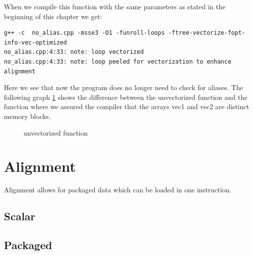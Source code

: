 \documentclass[
	12pt,
	a4paper,
	BCOR10mm,
	DIV14,
	headsepline,
	usegeometry,
]{scrreprt}
\begin{document}
When we compile this function with the same parameters as stated in the beginning of this chapter
we get: 
\begin{verbatim}
g++ -c  no_alias.cpp -msse3 -O1 -funroll-loops -ftree-vectorize-fopt-info-vec-optimized
no_alias.cpp:4:33: note: loop vectorized
no_alias.cpp:4:33: note: loop peeled for vectorization to enhance alignment
\end{verbatim}
Here we see that now the program does no longer need to check for aliases.
The following graph \ref{tik:uvVsNa} shows the difference between the unvectorized function and the function where
we assured the compiler that the arrays vec1 and vec2 are distinct memory blocks.

\begin{figure}[ht]
        \caption{unvectorized function}
        \label{tik:uvVsNa}
    \end{figure}


\section{Alignment}
Alignment allows for packaged data which can be loaded in one instruction.
\subsection{Scalar}
\subsection{Packaged}
\end{document}

